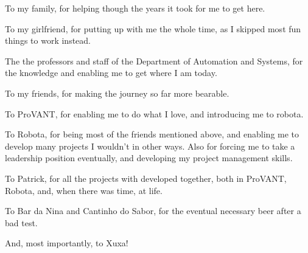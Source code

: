 \begin{agradecimentos}

To my family, for helping though the years it took for me to get here.

To my girlfriend, for putting up with me the whole time, as I skipped most fun things to work instead.

The the professors and staff of the Department of Automation and Systems, for the knowledge and enabling me to get where I am today.

To my friends, for making the journey so far more bearable.

To ProVANT, for enabling me to do what I love, and introducing me to robota. 

To Robota, for being most of the friends mentioned above, and enabling me to develop many projects I wouldn't in other ways. Also for forcing me to take a leadership position eventually, and developing my project management skills.

To Patrick, for all the projects with developed together, both in ProVANT, Robota, and, when there was time, at life.

To Bar da Nina and Cantinho do Sabor, for the eventual necessary beer after a bad test.

And, most importantly, to Xuxa!


\end{agradecimentos}
